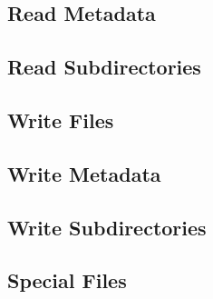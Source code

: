 \subsection{Read Metadata}
\label{sec-implementation-readmeta}

\subsection{Read Subdirectories}
\label{sec-implementation-readsubdirs}

\subsection{Write Files}
\label{sec-implementation-writefiles}

\subsection{Write Metadata}
\label{sec-implementation-writemeta}

\subsection{Write Subdirectories}
\label{sec-implementation-writesubdirs}

\subsection{Special Files}
\label{sec-implementation-special}
